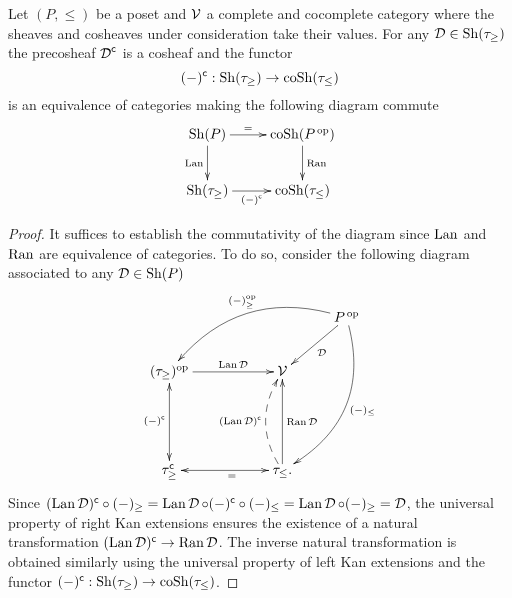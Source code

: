 \documentclass[thesis.tex]{subfiles}
\begin{document}
\begin{lemma} \label{Sheaves on posets are sheaves on Alexandrov}
Let $(P,\leq)$ be a poset and $\operatorname{\mathcal{V}}$ a complete and cocomplete category where the sheaves and cosheaves under consideration take their values. For any $\operatorname{\mathcal{D}}\in\operatorname{Sh}(\tau_\geq)$ the precosheaf $\operatorname{\mathcal{D}}^{\mathsf{c}}$ is a cosheaf and the functor
$$(-)^{\mathsf{c}}:\operatorname{Sh}(\tau_\geq)\to\operatorname{coSh}(\tau_{\leq})$$
is an equivalence of categories making the following diagram commute
$$\xymatrix@C=2pc @R=2pc{ \Sh(P) \ar[d]_{\Lan} \ar[r]^-{=} & \coSh(P^{\,\op})  \ar[d]^{\Ran}  \\
\Sh(\tau_\geq) \ar[r]_-{(-)^{\c}} & \coSh(\tau_{\leq})}$$
\begin{proof}
It suffices to establish the commutativity of the diagram since $\operatorname{Lan}$ and $\operatorname{Ran}$ are equivalence of categories. To do so, consider the following diagram associated to any $\operatorname{\mathcal{D}}\in\operatorname{Sh}(P)$
$$\xymatrix{
                                     &&      & P^{\,\op} \ar[dl]^{\D} \ar@/_2pc/[dlll]_{(-)^{\op}_\geq} \ar@/^2pc/[dddl]^{(-)_\leq} \\
(\tau_\geq)^{\op} \ar[rr]^-{\Lan \D} && \V   &         \\
&&& \\
\tau_\geq^\c \ar@{<->}[uu]^{(-)^\c}  && \ar@{<->}[ll]^-{\ \ \ =} \tau_\leq \ar[uu]_-{\Ran\D} \ar@{-->}@/^1pc/[uu]^-{(\Lan\D)^{\c}}. & }$$
Since $(\operatorname{Lan}\operatorname{\mathcal{D}})^{\mathsf{c}}\circ(-)_\geq=\operatorname{Lan}\operatorname{\mathcal{D}}\circ(-)^{\mathsf{c}}\circ(-)_\leq=\operatorname{Lan}\operatorname{\mathcal{D}}\circ(-)_\geq=\operatorname{\mathcal{D}}$, the universal property of right Kan extensions ensures the existence of a natural transformation $(\operatorname{Lan}\operatorname{\mathcal{D}})^{\mathsf{c}}\to\operatorname{Ran}\operatorname{\mathcal{D}}$. The inverse natural transformation is obtained similarly using the universal property of left Kan extensions and the functor $(-)^{\mathsf{c}}:\operatorname{Sh}(\tau_\geq)\to\operatorname{coSh}(\tau_\leq)$.
\end{proof}
\end{lemma}
\end{document}
